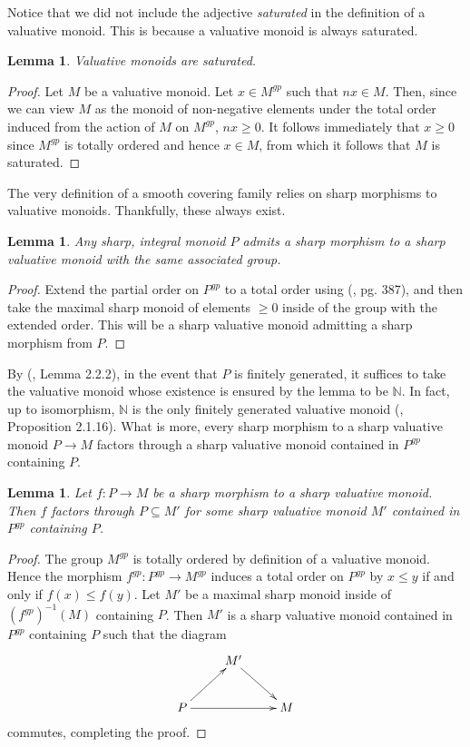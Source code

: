 \documentclass[12pt]{amsart}
\numberwithin{equation}{section}
\theoremstyle{plain}
\newtheorem{lem}[equation]{Lemma}
\theoremstyle{remark}
\newcommand{\NN}{\mathbb N}
\begin{document}
 Notice that we did not include the adjective \emph{saturated} in the definition of a valuative monoid. This is because a valuative monoid is always saturated.
\begin{lem}
	Valuative monoids are saturated.
\end{lem}
\begin{proof}
	Let $M$ be a valuative monoid. Let $x\in M^{gp}$ such that $nx\in M$. Then, since we can view $M$ as the monoid of non-negative elements under the total order induced from the action of $M$ on $M^{gp}$, $nx\geq 0$. It follows immediately that $x\geq 0$ since $M^{gp}$ is totally ordered and hence $x\in M$, from which it follows that $M$ is saturated.
\end{proof}
The very definition of a smooth covering family relies on sharp morphisms to valuative monoids. Thankfully, these always exist.
\begin{lem}\label{sharpValMor}
	Any sharp, integral monoid $P$ admits a sharp morphism to a sharp valuative monoid with the same associated group.
\end{lem}
\begin{proof}
	Extend the partial order on $P^{gp}$ to a total order using (\cite{Marczewski}, pg. 387), and then take the maximal sharp monoid of elements $\geq 0$ inside of the group with the extended order. This will be a sharp valuative monoid admitting a sharp morphism from $P$.
\end{proof}
By (\cite{Ogus}, Lemma 2.2.2), in the event that $P$ is finitely generated, it suffices to take the valuative monoid whose existence is ensured by the lemma to be $\NN$. In fact, up to isomorphism, $\NN$ is the only finitely generated valuative monoid (\cite{Ogus}, Proposition 2.1.16). What is more, every sharp morphism to a sharp valuative monoid $P\to M$ factors through a sharp valuative monoid contained in $P^{gp}$ containing $P$.
\begin{lem}\label{valuativeFactorization}
	Let $f: P\to M$ be a sharp morphism to a sharp valuative monoid. Then $f$ factors through $P\subseteq M'$ for some sharp valuative monoid $M'$ contained in $P^{gp}$ containing $P$.
\end{lem}
\begin{proof}
	The group $M^{gp}$ is totally ordered by definition of a valuative monoid. Hence the morphism $f^{gp}:P^{gp}\to M^{gp}$ induces a total order on $P^{gp}$ by $x\leq y$ if and only if $f(x) \leq f(y)$. Let $M'$ be a maximal sharp monoid inside of $(f^{gp})^{-1}(M)$ containing $P$. Then $M'$ is a sharp valuative monoid contained in $P^{gp}$ containing $P$ such that the diagram
$$\xymatrix{
	& M' \ar[dr] & \\
	P \ar[ur]\ar[rr] & & M\\
	}$$
commutes, completing the proof.
\end{proof}
\end{document}

